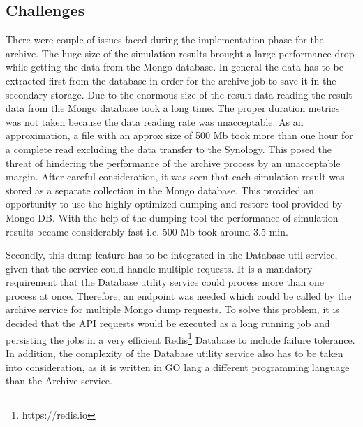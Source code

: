 \subsection{Challenges}
There were couple of issues faced during the implementation phase for the archive. The huge size of the simulation results brought a large
performance drop while getting the data from the Mongo database. In general the data has to be extracted first from the database in order for the archive job
to save it in the secondary storage. Due to the enormous size of the result data reading the result data from the Mongo database took a long time. The proper duration
metrics was not taken because the data reading rate was unacceptable. As an approximation, a file with an approx size of 500 Mb took more than one hour 
for a complete read excluding the data transfer to the Synology. This posed the threat of hindering the performance of the archive process by an unacceptable margin.
After careful consideration, it was seen that each simulation result was stored as a separate collection in the Mongo database. This provided an opportunity to use
the highly optimized dumping and restore tool provided by Mongo DB. With the help of the dumping tool the performance of simulation results became considerably fast i.e.
500 Mb took around 3.5 min.

Secondly, this dump feature has to be integrated in the Database util service, given that the service could handle multiple requests. It is a mandatory requirement that the Database
utility service could process more than one process at once. Therefore, an endpoint was needed which could be called by the archive service for multiple Mongo dump
requests. To solve this problem, it is decided that the API requests would be executed as a long running job and persisting the jobs in a very efficient 
Redis\footnote{https://redis.io} Database to include failure tolerance. In addition, the complexity of the Database utility service also has to be taken into consideration, as it 
is written in GO lang a different programming language than the Archive service.
